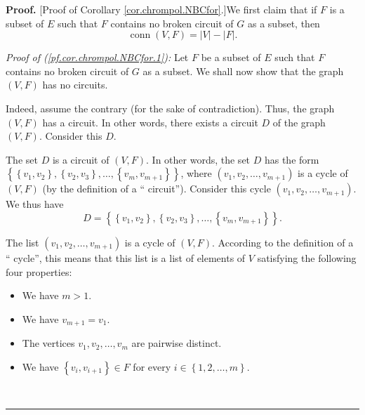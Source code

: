 \documentclass[numbers=enddot,12pt,final,onecolumn,notitlepage]{scrartcl}%
\theoremstyle{definition}
\newenvironment{proof}[1][Proof]{\noindent\textbf{#1.} }{\ \rule{0.5em}{0.5em}}
\newenvironment{verlong}{}{}
\begin{document}
\begin{verlong}
\begin{proof}
[Proof of Corollary \ref{cor.chrompol.NBCfor}.]We first claim that if $F$ is a
subset of $E$ such that $F$ contains no broken circuit of $G$ as a subset,
then%
\begin{equation}
\operatorname*{conn}\left(  V,F\right)  =\left\vert V\right\vert -\left\vert
F\right\vert . \label{pf.cor.chrompol.NBCfor.1}%
\end{equation}


\textit{Proof of (\ref{pf.cor.chrompol.NBCfor.1}):} Let $F$ be a subset of $E$
such that $F$ contains no broken circuit of $G$ as a subset. We shall now show
that the graph $\left(  V,F\right)  $ has no circuits.

Indeed, assume the contrary (for the sake of contradiction). Thus, the graph
$\left(  V,F\right)  $ has a circuit. In other words, there exists a circuit
$D$ of the graph $\left(  V,F\right)  $. Consider this $D$.

The set $D$ is a circuit of $\left(  V,F\right)  $. In other words, the set
$D$ has the form $\left\{  \left\{  v_{1},v_{2}\right\}  ,\left\{  v_{2}%
,v_{3}\right\}  ,\ldots,\left\{  v_{m},v_{m+1}\right\}  \right\}  $, where
$\left(  v_{1},v_{2},\ldots,v_{m+1}\right)  $ is a cycle of $\left(
V,F\right)  $ (by the definition of a \textquotedblleft
circuit\textquotedblright). Consider this cycle $\left(  v_{1},v_{2}%
,\ldots,v_{m+1}\right)  $. We thus have
\begin{equation}
D=\left\{  \left\{  v_{1},v_{2}\right\}  ,\left\{  v_{2},v_{3}\right\}
,\ldots,\left\{  v_{m},v_{m+1}\right\}  \right\}  .
\label{pf.cor.chrompol.NBCfor.5}%
\end{equation}


The list $\left(  v_{1},v_{2},\ldots,v_{m+1}\right)  $ is a cycle of $\left(
V,F\right)  $. According to the definition of a \textquotedblleft
cycle\textquotedblright, this means that this list is a list of elements of
$V$ satisfying the following four properties:

\begin{itemize}
\item We have $m>1$.

\item We have $v_{m+1}=v_{1}$.

\item The vertices $v_{1},v_{2},\ldots,v_{m}$ are pairwise distinct.

\item We have $\left\{  v_{i},v_{i+1}\right\}  \in F$ for every $i\in\left\{
1,2,\ldots,m\right\}  $.
\end{itemize}


\end{proof}
\end{verlong}
\end{document}
